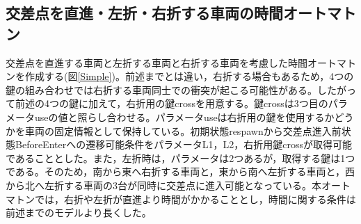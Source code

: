 \documentclass{tpu-sotu}
\begin{document}
	\subsection{交差点を直進・左折・右折する車両の時間オートマトン}
	交差点を直進する車両と左折する車両と右折する車両を考慮した時間オートマトンを作成する(図\ref{Simple})。前述までとは違い，右折する場合もあるため，4つの鍵の組み合わせでは右折する車両同士での衝突が起こる可能性がある。したがって前述の4つの鍵に加えて，右折用の鍵crossを用意する。鍵crossは3つ目のパラメータuseの値と照らし合わせる。パラメータuseは右折用の鍵を使用するかどうかを車両の固定情報として保持している。初期状態respawnから交差点進入前状態BeforeEnterへの遷移可能条件をパラメータL1，L2，右折用鍵crossが取得可能であることとした。また，左折時は，パラメータは2つあるが，取得する鍵は1つである。そのため，南から東へ右折する車両と，東から南へ左折する車両と，西から北へ左折する車両の3台が同時に交差点に進入可能となっている。本オートマトンでは，右折や左折が直進より時間がかかることとし，時間に関する条件は前述までのモデルより長くした。
	
\end{document}
